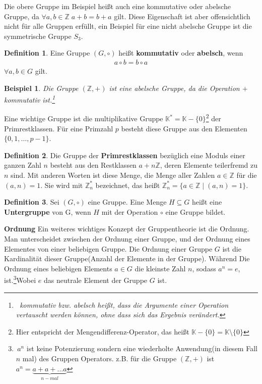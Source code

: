 \documentclass[12pt,oneside]{article}
\newtheorem{example}[theorem]{Beispiel}
\theoremstyle{remark}
\theoremstyle{definition}
\newtheorem{definition}{Definition}[section]
\begin{document}
Die obere Gruppe im Beispiel heißt auch eine kommutative oder abelsche Gruppe, da $\forall a,b \in \mathbb{Z} \; a + b = b + a $ gilt. Diese Eigenschaft ist aber offensichtlich nicht für alle Gruppen erfüllt, ein Beispiel für eine nicht abelsche Gruppe ist die symmetrische Gruppe $S_3$\cite{s3}.

\begin{definition}
Eine Gruppe $(G,\circ)$ heißt \textbf{kommutativ} oder \textbf{abelsch}, wenn
\begin{align*}
    a \circ b = b \circ a  
\end{align*}
$\forall a,b \in G$ gilt.
\end{definition}

\smallskip

\begin{example}
Die Gruppe $(\mathbb{Z},+)$ ist eine abelsche Gruppe, da die Operation $+$ kommutativ ist.\footnote{$\,$ kommutativ bzw. abelsch heißt, dass die Argumente einer Operation vertauscht werden können, ohne dass sich das Ergebnis verändert.}
\end{example}

\smallskip

Eine wichtige Gruppe ist die multiplikative Gruppe $\mathbb{K}^{*} = \mathbb{K} - \{ 0\}$\footnote{Hier entspricht der Mengendifferenz-Operator, das heißt $\mathbb{K} - \{ 0\} = \mathbb{K}\setminus \{ 0\}$ } der Primrestklassen. Für eine Primzahl $p$ besteht diese Gruppe aus den Elementen $\{ 0,1,\dots, p - 1 \}$.

\begin{definition}\label{mul-group}
Die Gruppe der \textbf{Primrestklassen} bezüglich eine Moduls einer ganzen Zahl $n$ besteht aus den Restklassen $a + n\mathbb{Z}$, deren Elemente teilerfremd zu $n$ sind. Mit anderen Worten ist diese Menge, die Menge aller Zahlen $a \in \mathbb{Z}$ für die $(a,n) = 1$. Sie wird mit $\mathbb{Z}_{n}^{*}$ bezeichnet, das heißt $\mathbb{Z}_{n}^{*} = \{ a \in \mathbb{Z} \mid (a,n) = 1 \}$.
\end{definition}

\smallskip

\begin{definition}
Sei $(G,\circ)$ eine Gruppe. Eine Menge $H \subseteq G$ heißt eine \textbf{Untergruppe} von G, wenn $H$ mit der Operation $\circ$ eine Gruppe bildet.
\end{definition}

\smallskip

\textbf{Ordnung}\newline
Ein weiteres wichtiges Konzept der Gruppentheorie ist die Ordnung. Man unterscheidet zwischen der Ordnung einer Gruppe, und der Ordnung eines Elementes von einer beliebigen Gruppe. Die Ordnung einer Gruppe $G$ ist die Kardinalität dieser Gruppe(Anzahl der Elemente in der Gruppe). Während Die Ordnung eines beliebigen Elements $a \in G$ die kleinste Zahl $n$, sodass $a^n =e$, ist.\footnote{$\, a^n$ ist keine Potenzierung sondern eine wiederholte Anwendung(in diesem Fall $n$ mal) des Gruppen Operators. z.B. für die Gruppe $(\mathbb{Z},+)$ ist $a^n = \underbrace{a + a + \dots a}_{n-mal}$}Wobei $e$ das neutrale Element der Gruppe $G$ ist.  
\end{document}
